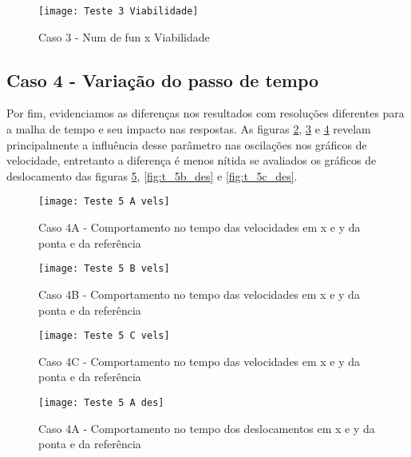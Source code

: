 \begin{figure}[H]
    \begin{center}
    \caption{Caso 3 - Num de fun x Viabilidade}
    \texttt{[image: Teste 3 Viabilidade]}
    \label{fig:t_3_viab}
    \end{center}
\end{figure}

\subsection{Caso 4 - Variação do passo de tempo}
Por fim, evidenciamos as diferenças nos resultados com resoluções diferentes para a malha de tempo e seu impacto nas respostas.
As figuras \ref{fig:t_5a_vels}, \ref{fig:t_5b_vels} e \ref{fig:t_5c_vels} revelam principalmente a influência desse parâmetro
nas oscilações nos gráficos de velocidade, entretanto a diferença é menos nítida se avaliados os gráficos de deslocamento das figuras
\ref{fig:t_5a_des}, \ref{fig:t_5b_des} e \ref{fig:t_5c_des}.

\begin{figure}[H]
    \begin{center}
    \caption{Caso 4A - Comportamento no tempo das velocidades em x e y da ponta e da referência}
    \texttt{[image: Teste 5 A vels]}
    \label{fig:t_5a_vels}
    \end{center}
\end{figure}

\begin{figure}[H]
    \begin{center}
    \caption{Caso 4B - Comportamento no tempo das velocidades em x e y da ponta e da referência}
    \texttt{[image: Teste 5 B vels]}
    \label{fig:t_5b_vels}
    \end{center}
\end{figure}

\begin{figure}[H]
    \begin{center}
    \caption{Caso 4C - Comportamento no tempo das velocidades em x e y da ponta e da referência}
    \texttt{[image: Teste 5 C vels]}
    \label{fig:t_5c_vels}
    \end{center}
\end{figure}

\begin{figure}[H]
    \begin{center}
    \caption{Caso 4A - Comportamento no tempo dos deslocamentos em x e y da ponta e da referência}
    \texttt{[image: Teste 5 A des]}
    \label{fig:t_5a_des}
    \end{center}
\end{figure}

